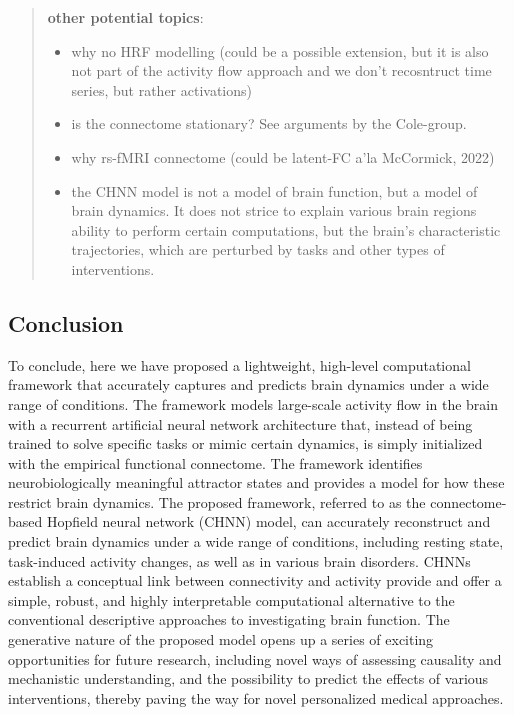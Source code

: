 \documentclass{article}
\begin{document}
\begin{quote}
\textbf{other potential topics}:

\begin{itemize}
\item why no HRF modelling (could be a possible extension, but it is also not part of the activity flow approach and we don't recosntruct time series, but rather activations)
\item is the connectome stationary? See arguments by the Cole-group.
\item why rs-fMRI connectome (could be latent-FC a'la McCormick, 2022)
\item the CHNN model is not a model of brain function, but a model of brain dynamics. It does not strice to explain various brain regions ability to perform certain computations, but the brain's characteristic trajectories, which are perturbed by tasks and other types of interventions.
\end{itemize}
\end{quote}

\subsection{Conclusion}\label{Conclusion}

To conclude, here we have proposed a lightweight, high-level computational framework that accurately captures and predicts brain dynamics
under a wide range of conditions. The framework models large-scale activity flow in the brain with a recurrent
artificial neural network architecture that, instead of being trained to solve specific tasks or mimic certain dynamics,
is simply initialized with the empirical functional connectome. The framework identifies neurobiologically meaningful
attractor states and provides a model for how these restrict brain dynamics. The proposed framework, referred to as the
connectome-based Hopfield neural network (CHNN) model, can accurately reconstruct and predict brain dynamics under a wide range of
conditions, including resting state, task-induced activity changes, as well as in various brain disorders. CHNNs establish a conceptual link between connectivity and activity provide and offer a simple, robust, and highly interpretable computational alternative to the conventional descriptive approaches to investigating brain function. The generative nature of the proposed model opens up a series of exciting opportunities for future research, including novel ways of assessing causality and mechanistic understanding, and the possibility to predict the effects of various interventions, thereby paving the way for novel personalized medical approaches.
\end{document}
